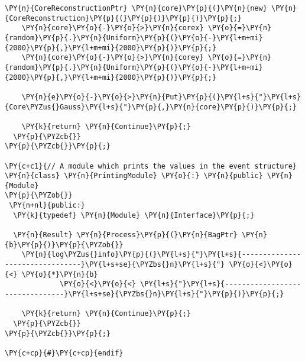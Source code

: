 \begin{Verbatim}[commandchars=\\\{\}]
    \PY{n}{CoreReconstructionPtr} \PY{n}{core}\PY{p}{(}\PY{n}{new} \PY{n}{CoreReconstruction}\PY{p}{(}\PY{p}{)}\PY{p}{)}\PY{p}{;}
    \PY{n}{core}\PY{o}{-}\PY{o}{>}\PY{n}{corex} \PY{o}{=}\PY{n}{random}\PY{p}{.}\PY{n}{Uniform}\PY{p}{(}\PY{o}{-}\PY{l+m+mi}{2000}\PY{p}{,}\PY{l+m+mi}{2000}\PY{p}{)}\PY{p}{;} 
    \PY{n}{core}\PY{o}{-}\PY{o}{>}\PY{n}{corey} \PY{o}{=}\PY{n}{random}\PY{p}{.}\PY{n}{Uniform}\PY{p}{(}\PY{o}{-}\PY{l+m+mi}{2000}\PY{p}{,}\PY{l+m+mi}{2000}\PY{p}{)}\PY{p}{;} 

    \PY{n}{e}\PY{o}{-}\PY{o}{>}\PY{n}{Put}\PY{p}{(}\PY{l+s}{"}\PY{l+s}{Core\PYZus{}Gauss}\PY{l+s}{"}\PY{p}{,}\PY{n}{core}\PY{p}{)}\PY{p}{;}

    \PY{k}{return} \PY{n}{Continue}\PY{p}{;}
  \PY{p}{\PYZcb{}}
\PY{p}{\PYZcb{}}\PY{p}{;}

\PY{c+c1}{// A module which prints the values in the event structure}
\PY{n}{class} \PY{n}{PrintingModule} \PY{o}{:} \PY{n}{public} \PY{n}{Module}
\PY{p}{\PYZob{}}
 \PY{n+nl}{public:}
  \PY{k}{typedef} \PY{n}{Module} \PY{n}{Interface}\PY{p}{;}

  \PY{n}{Result} \PY{n}{Process}\PY{p}{(}\PY{n}{BagPtr} \PY{n}{b}\PY{p}{)}\PY{p}{\PYZob{}}
    \PY{n}{log\PYZus{}info}\PY{p}{(}\PY{l+s}{"}\PY{l+s}{--------------------------------}\PY{l+s+se}{\PYZbs{}n}\PY{l+s}{"} \PY{o}{<}\PY{o}{<} \PY{o}{*}\PY{n}{b}
             \PY{o}{<}\PY{o}{<} \PY{l+s}{"}\PY{l+s}{--------------------------------}\PY{l+s+se}{\PYZbs{}n}\PY{l+s}{"}\PY{p}{)}\PY{p}{;}

    \PY{k}{return} \PY{n}{Continue}\PY{p}{;}
  \PY{p}{\PYZcb{}}
\PY{p}{\PYZcb{}}\PY{p}{;}

\PY{c+cp}{#}\PY{c+cp}{endif}
\end{Verbatim}
